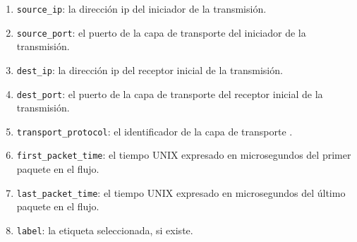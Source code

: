 \begin{enumerate}
  \item \texttt{source\_ip}: la dirección \acrshort{ip} del iniciador de la transmisión.
  \item \texttt{source\_port}: el puerto de la capa de transporte del iniciador de la transmisión.
  \item \texttt{dest\_ip}: la dirección \acrshort{ip} del receptor inicial de la transmisión.
  \item \texttt{dest\_port}: el puerto de la capa de transporte del receptor inicial de la transmisión.
  \item \texttt{transport\_protocol}: el identificador de la capa de transporte \cite{ipprotocolnumbers}.
  \item \texttt{first\_packet\_time}: el tiempo UNIX expresado en microsegundos del primer paquete en el flujo.
  \item \texttt{last\_packet\_time}:  el tiempo UNIX expresado en microsegundos del último paquete en el flujo.
  \item \texttt{label}: la etiqueta seleccionada, si existe.
\end{enumerate}
